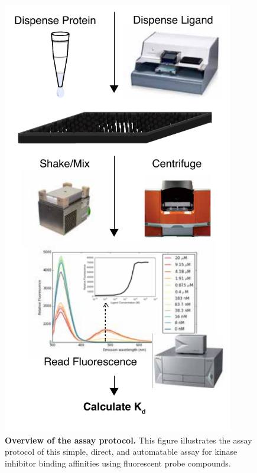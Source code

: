 \documentclass[aps,pre,twocolumn,nofootinbib,superscriptaddress,linenumbers,11point]{revtex4-1}
\begin{document}
\maketitle



\begin{figure}[tbp]
\includegraphics[width=0.9\textwidth]{Overview-v3.pdf}
\caption{\label{figure:example} {\bf Overview of the assay protocol.} 
This figure illustrates the assay protocol of this simple, direct, and automatable assay for kinase inhibitor binding affinities using fluorescent probe compounds.
}
\end{figure}
\end{document}
